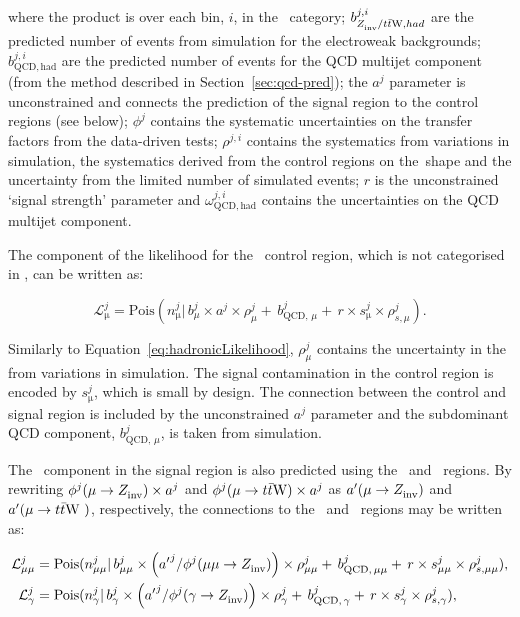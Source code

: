 \noindent where the product is over each \mht bin, $i$, in the \htcat~category; $b^{j,i}_{Z_{\rm inv}^{~}/t\bar{t}\text{W},had}$ are the predicted number 
of events from simulation for the electroweak backgrounds; 
$b^{j,i}_{\text{QCD},\mathrm{had}}$ are the predicted 
number of events for the QCD multijet component (from the method described in Section~\ref{sec:qcd-pred});
the $a^{j}$ parameter is unconstrained and connects the prediction of the signal region
to the control regions (see below); $\phi^{j}$ contains the systematic uncertainties on the 
transfer factors from the data-driven tests; $\rho^{j,i}$ contains the systematics from 
variations in simulation, the systematics derived from the control regions on the~\mht shape 
and the uncertainty from the limited number of simulated events; 
$r$ is the unconstrained `signal strength' parameter and $\omega_{\text{QCD},\mathrm{had}}^{j,i}$ 
contains the uncertainties on the QCD multijet component. 

The component of the likelihood for the \mj~control region, 
which is not categorised in \mht, can be written as:

\begin{equation}
\label{eq:muLikelihood}
\mathcal{L}^{j}_{\mathrm{\mu}} = \mathrm{Pois}(n^{j}_{\mathrm{\mu}} |\, b^{j}_{\mu}\times a^{j}\times\rho^{j}_{\mu} +\, b^{j}_{\text{QCD},\,\mu} + \,r \times s^{j}_{\mathrm{\mu}}\times\rho^{j}_{s,\mu}).
\end{equation}

\noindent Similarly to Equation~\ref{eq:hadronicLikelihood}, $\rho^{j}_{\mu}$ contains the uncertainty in the \htcat from variations in simulation. 
The signal contamination in the control region is encoded by $s^{j}_{\mathrm{\mu}}$, which is small by design. 
The connection between the control and signal region
is included by the unconstrained $a^{j}$ parameter and the 
subdominant QCD component, $b^{j}_{\text{QCD},\,\mu}$, is taken from simulation. 

The \zInv~component in the signal region is also predicted using the \gj~and \mmj~regions. 
By rewriting $\phi^{j}(\mu\rightarrow Z_{\rm inv}^{~})\times a^{j}$ and $\phi^{j}(\mu\rightarrow t\bar{t}\text{W})\times a^{j}$
as ${a'}(\mu\rightarrow Z_{\rm inv}^{~})$ and $a'(\mu\rightarrow t\bar{t}\text{W}~)$, respectively, the connections to the \gj~and \mmj~regions
may be written as:

\begin{align}
\label{eq:mumuGammaLikelihood}
\mathcal{L}^{j}_{\mathrm{\mu\mu}} &= \mathrm{Pois}(n^{j}_{\mathrm{\mu\mu}} |\, b^{j}_{\mu\mu}\times 
\left({a'}^{j}/\phi^{j}(\mu\mu\rightarrow Z_{\rm inv}^{~})\right)\times\rho^{j}_{\mu\mu} +\,b^{j}_{\text{QCD},\,\mu\mu} + \,r\times s^{j}_{\mathrm{\mu\mu}}\times\rho^{j}_{s,\mu\mu}), \\
\mathcal{L}^{j}_{\mathrm{\gamma}} &= \mathrm{Pois}(n^{j}_{\mathrm{\gamma}} |\, b^{j}_{\gamma}\times 
\left({a'}^{j}/\phi^{j}(\gamma\rightarrow Z_{\rm inv}^{~})\right)\times\rho^{j}_{\gamma} + \,b^{j}_{\text{QCD},\,\gamma} + \,r\times s^{j}_{\mathrm{\gamma}}\times\rho^{j}_{s,\gamma}),
\end{align}

